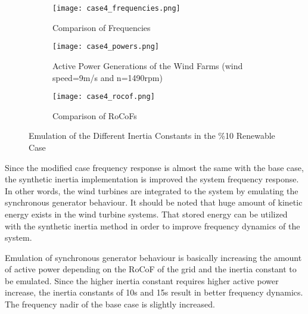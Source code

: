 \begin{figure}[h!]
	\centering
	\begin{subfigure}{0.9\textwidth} %
		\centering	\texttt{[image: case4\_frequencies.png]}
		\caption{Comparison of Frequencies}		
		\label{Case4_freq}
	\end{subfigure}
\vspace{0.1em} %
\begin{subfigure}{0.9\textwidth}
	\centering	
	\texttt{[image: case4\_powers.png]}
	\caption{Active Power Generations of the Wind Farms (wind speed=9m/s and n=1490rpm)}
	\label{Case4_power}	
\end{subfigure}
	\vspace{0.1em} %
	\begin{subfigure}{0.9\textwidth}
		\centering	\texttt{[image: case4\_rocof.png]}
		\caption{Comparison of RoCoFs}
		\label{Case4_rocof}	
	\end{subfigure}

	\caption{Emulation of the Different Inertia Constants in the \%10 Renewable Case}
\end{figure}
Since the modified case frequency response is almost the same with the base case, the synthetic inertia implementation is improved the system frequency response. In other words, the wind turbines are integrated to the system by emulating the synchronous generator behaviour. It should be noted that huge amount of kinetic energy exists in the wind turbine systems. That stored energy can be utilized with the synthetic inertia method in order to improve frequency dynamics of the system.\par
Emulation of synchronous generator behaviour is basically increasing the amount of active power depending on the RoCoF of the grid and the inertia constant to be emulated. Since the higher inertia constant requires higher active power increase, the inertia constants of 10s and 15s result in better frequency dynamics. The frequency nadir of the base case is slightly increased. \par
